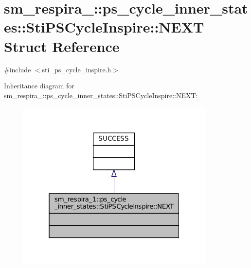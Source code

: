 \hypertarget{structsm__respira__1_1_1ps__cycle__inner__states_1_1StiPSCycleInspire_1_1NEXT}{}\section{sm\+\_\+respira\+\_\+:\+:ps\+\_\+cycle\+\_\+inner\+\_\+states\+:\+:Sti\+P\+S\+Cycle\+Inspire\+:\+:N\+E\+XT Struct Reference}
\label{structsm__respira__1_1_1ps__cycle__inner__states_1_1StiPSCycleInspire_1_1NEXT}


{\ttfamily \#include $<$sti\+\_\+ps\+\_\+cycle\+\_\+inspire.\+h$>$}



Inheritance diagram for sm\+\_\+respira\+\_\+:\+:ps\+\_\+cycle\+\_\+inner\+\_\+states\+:\+:Sti\+P\+S\+Cycle\+Inspire\+:\+:N\+E\+XT\+:
\nopagebreak
\begin{figure}[H]
\begin{center}
\leavevmode
\includegraphics[width=280pt]{structsm__respira__1_1_1ps__cycle__inner__states_1_1StiPSCycleInspire_1_1NEXT__inherit__graph}
\end{center}
\end{figure}


